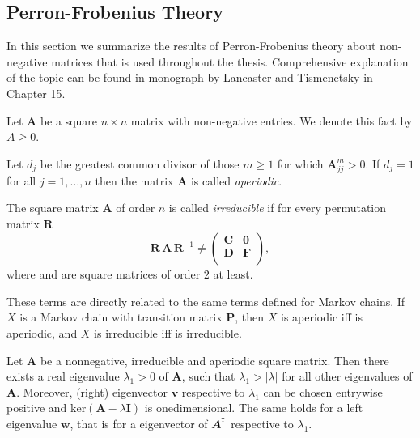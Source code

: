 \begin{appendices}

\chapter{Perron-Frobenius Theory}
In this section we summarize the results of Perron-Frobenius theory about non-negative matrices that is used throughout the thesis. Comprehensive explanation of the topic can be found in monograph by Lancaster and Tismenetsky \cite{Lancaster} in Chapter 15.

Let $\bm{A}$ be a square $n\times n$ matrix with non-negative entries. We denote this fact by $A\geq0$.
\begin{df}
Let $d_j$ be the greatest common divisor of those $m\geq1$ for which $\bm{A}^m_{jj}>0$. If $d_j=1$ for all $j=1,\dots,n$ then the matrix $\bm{A}$ is called {\em aperiodic}. 
\end{df}
\begin{df}
The square matrix $\bm{A}$ of order $n$ is called {\em irreducible} if for every permutation matrix $\bm{R}$
\[ \bm{R}\,\bm{A}\,\bm{R}^{-1}\neq\left( \begin{array}{cc}
\bm{C} & \bm{0}  \\
\bm{D} & \bm{F}  \\
\end{array} \right), \] 
where  and  are square matrices of order $2$ at least.
\end{df}
\noindent These terms are directly related to the same terms defined for Markov chains. If $X$ is a Markov chain with transition matrix $\bm{P}$, then $X$ is aperiodic iff  is aperiodic, and $X$ is irreducible iff  is irreducible.

\begin{thm} 
\label{PF}
Let $\bm{A}$ be a nonnegative, irreducible and aperiodic square matrix. Then there exists a real eigenvalue $\lambda_1>0$ of $\bm{A}$, such that $\lambda_1>|\lambda|$ for all other eigenvalues of $\bm{A}$. Moreover, (right) eigenvector $\bm{v}$ respective to $\lambda_1$ can be chosen entrywise positive and $\text{ker}(\bm{A}-\lambda\bm{I})$ is onedimensional. The same holds for a left eigenvalue $\bm{w}$, that is for a eigenvector of $\mbox{\boldmath{$A$}}^{^{_\texttt T}}$ respective to $\lambda_1$.
\end{thm}


\end{appendices}
